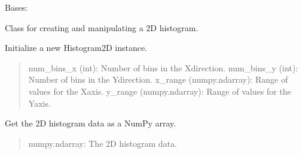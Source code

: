 \documentclass[letterpaper,10pt,english]{sphinxmanual}
\begin{document}
\begin{fulllineitems}
\label{\detokenize{HF:Histogram.Histogram2D}}
\pysigstartsignatures
{}
\pysigstopsignatures
\sphinxAtStartPar
Bases: 

\sphinxAtStartPar
Class for creating and manipulating a 2D histogram.

\begin{fulllineitems}
\label{\detokenize{HF:Histogram.Histogram2D.__init__}}
\pysigstartsignatures
{}
\pysigstopsignatures
\sphinxAtStartPar
Initialize a new Histogram2D instance.
\begin{quote}\begin{description}
\sphinxAtStartPar
num\_bins\_x (int): Number of bins in the X\sphinxhyphen{}direction.
num\_bins\_y (int): Number of bins in the Y\sphinxhyphen{}direction.
x\_range (numpy.ndarray): Range of values for the X\sphinxhyphen{}axis.
y\_range (numpy.ndarray): Range of values for the Y\sphinxhyphen{}axis.

\end{description}\end{quote}

\end{fulllineitems}


\begin{fulllineitems}
\label{\detokenize{HF:Histogram.Histogram2D.histogram_2d}}
\pysigstartsignatures
{}
\pysigstopsignatures
\sphinxAtStartPar
Get the 2D histogram data as a NumPy array.
\begin{quote}\begin{description}
\sphinxAtStartPar
numpy.ndarray: The 2D histogram data.


\end{description}
\end{quote}
\end{fulllineitems}
\end{fulllineitems}
\end{document}
